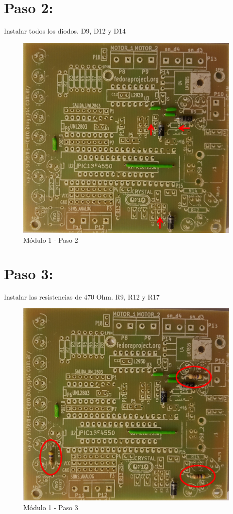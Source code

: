 \newpage

\section{Paso 2:}

Instalar todos los diodos. D9, D12 y D14

\begin{figure}[h]
	\centering
	\includegraphics[width=0.8\linewidth]{Modulo_1/M1_2}
	\caption{Módulo 1 - Paso 2}
	\label{fig:M1_2}
\end{figure}

\newpage

\section{Paso 3:}

Instalar las resistencias de 470 Ohm. R9, R12 y R17

\begin{figure}[h]
	\centering
	\includegraphics[width=0.8\linewidth]{Modulo_1/M1_3}
	\caption{Módulo 1 - Paso 3}
	\label{fig:M1_3}
\end{figure}

